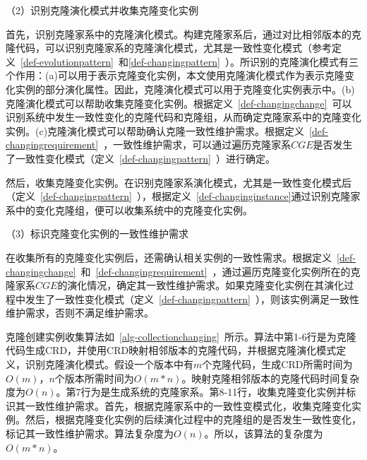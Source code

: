 （2）识别克隆演化模式并收集克隆变化实例

首先，识别克隆家系中的克隆演化模式。构建克隆家系后，通过对比相邻版本的克隆代码，可以识别克隆家系的克隆演化模式，尤其是一致性变化模式（参考定义~\ref{def-evolutionpattern}~和\ref{def-changingpattern}~）。所识别的克隆演化模式有三个作用：(a)可以用于表示克隆变化实例，本文使用克隆演化模式作为表示克隆变化实例的部分演化属性。因此，克隆演化模式可以用于克隆变化实例表示中。(b)克隆演化模式可以帮助收集克隆变化实例。根据定义~\ref{def-changingchange}~可以识别系统中发生一致性变化的克隆代码和克隆组，从而确定克隆家系中的克隆变化实例。(c)克隆演化模式可以帮助确认克隆一致性维护需求。根据定义~\ref{def-changingrequirement}~，一致性维护需求，可以通过遍历克隆家系$CGE$是否发生了一致性变化模式（定义~\ref{def-changingpattern}~）进行确定。

然后，收集克隆变化实例。在识别克隆家系演化模式，尤其是一致性变化模式后（定义~\ref{def-changingpattern}~），根据定义~\ref{def-changinginstance}通过识别克隆家系中的变化克隆组，便可以收集系统中的克隆变化实例。

（3）标识克隆变化实例的一致性维护需求

在收集所有的克隆变化实例后，还需确认相关实例的一致性需求。根据定义~\ref{def-changingchange}~和~\ref{def-changingrequirement}~，通过遍历克隆变化实例所在的克隆家系$CGE$的演化情况，确定其一致性维护需求。如果克隆变化实例在其演化过程中发生了一致性变化模式（定义~\ref{def-changingpattern}~），则该实例满足一致性维护需求，否则不满足维护需求。

克隆创建实例收集算法如~\ref{alg-collectionchanging}~所示。算法中第1-6行是为克隆代码生成CRD，并使用CRD映射相邻版本的克隆代码，并根据克隆演化模式定义，识别克隆演化模式。假设一个版本中有$m$个克隆代码，生成CRD所需时间为$O(m)$，$n$个版本所需时间为$O(m*n)$。映射克隆相邻版本的克隆代码时间复杂度为$O(n)$。第7行为是生成系统的克隆家系。第8-11行，收集克隆变化实例并标识其一致性维护需求。首先，根据克隆家系中的一致性变模式化，收集克隆变化实例。然后，根据克隆变化实例的后续演化过程中的克隆组的是否发生一致性变化，标记其一致性维护需求。算法复杂度为$O(n)$。所以，该算法的复杂度为$O(m*n)$。

